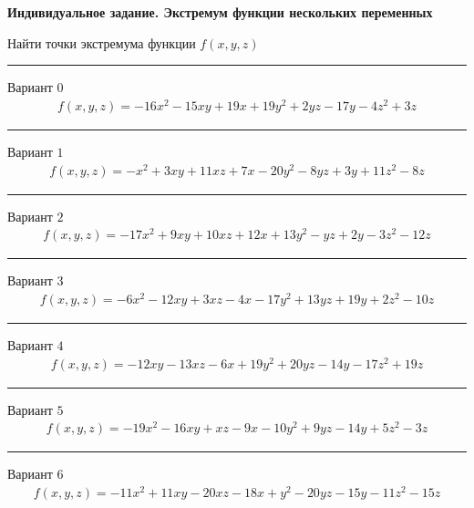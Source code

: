 \documentclass[11pt]{report}
\begin{document}
\pagestyle{empty}
{\bf Индивидуальное задание. Экстремум функции нескольких переменных}

Найти точки экстремума функции $f(x, y, z)$

\begin{center}
\noindent\rule{8cm}{0.4pt}
\end{center}
Вариант $0$
\begin{align*}
    f(x, y, z) = - 16 x^{2} - 15 x y + 19 x + 19 y^{2} + 2 y z - 17 y - 4 z^{2} + 3 z
\end{align*}
\begin{center}
\noindent\rule{8cm}{0.4pt}
\end{center}
Вариант $1$
\begin{align*}
    f(x, y, z) = - x^{2} + 3 x y + 11 x z + 7 x - 20 y^{2} - 8 y z + 3 y + 11 z^{2} - 8 z
\end{align*}
\begin{center}
\noindent\rule{8cm}{0.4pt}
\end{center}
Вариант $2$
\begin{align*}
    f(x, y, z) = - 17 x^{2} + 9 x y + 10 x z + 12 x + 13 y^{2} - y z + 2 y - 3 z^{2} - 12 z
\end{align*}
\begin{center}
\noindent\rule{8cm}{0.4pt}
\end{center}
Вариант $3$
\begin{align*}
    f(x, y, z) = - 6 x^{2} - 12 x y + 3 x z - 4 x - 17 y^{2} + 13 y z + 19 y + 2 z^{2} - 10 z
\end{align*}
\begin{center}
\noindent\rule{8cm}{0.4pt}
\end{center}
Вариант $4$
\begin{align*}
    f(x, y, z) = - 12 x y - 13 x z - 6 x + 19 y^{2} + 20 y z - 14 y - 17 z^{2} + 19 z
\end{align*}
\begin{center}
\noindent\rule{8cm}{0.4pt}
\end{center}
Вариант $5$
\begin{align*}
    f(x, y, z) = - 19 x^{2} - 16 x y + x z - 9 x - 10 y^{2} + 9 y z - 14 y + 5 z^{2} - 3 z
\end{align*}
\begin{center}
\noindent\rule{8cm}{0.4pt}
\end{center}
Вариант $6$
\begin{align*}
    f(x, y, z) = - 11 x^{2} + 11 x y - 20 x z - 18 x + y^{2} - 20 y z - 15 y - 11 z^{2} - 15 z
\end{align*}
\end{document}
